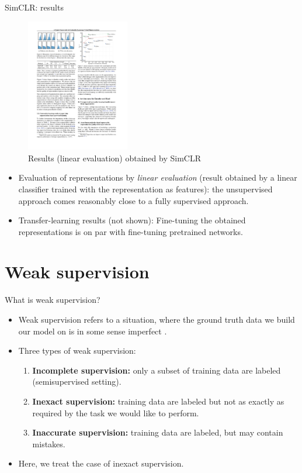 \documentclass[xcolor=pdftex,dvipsnames,table]{beamer}
\begin{document}
\begin{frame}{SimCLR: results}
\begin{figure}[htb]
   \centering
   \includegraphics[width=0.4\textwidth]{../graphics/simclr_results.pdf}
   \caption{Results (linear evaluation) obtained by SimCLR \cite{Chen2020}}
\end{figure}
\begin{itemize}
\item Evaluation of representations by \emph{linear evaluation} (result obtained by a linear classifier trained with the representation as features): the unsupervised approach comes reasonably close to a fully supervised approach. 
\item Transfer-learning results (not shown): Fine-tuning the obtained representations is on par with fine-tuning pretrained networks. 
\end{itemize}
\end{frame}

\section{Weak supervision}

\begin{frame}{What is weak supervision?}
\begin{itemize}
\item Weak supervision refers to a situation, where the ground truth data we build our model on is in some sense imperfect \cite{Zhou2018}. 
\item Three types of weak supervision:
\begin{enumerate}
\item \textbf{Incomplete supervision:} only a subset of training data are labeled (semisupervised setting).
\item \textbf{Inexact supervision:} training data are labeled but not as exactly as required by the task we would like to perform.
\item \textbf{Inaccurate supervision:} training data are labeled, but may contain mistakes. 
\end{enumerate}
\item Here, we treat the case of inexact supervision. 
\end{itemize}
\end{frame}
\end{document}
